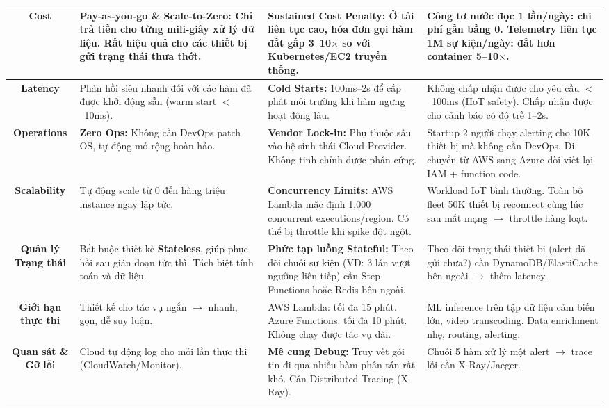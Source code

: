 \begin{longtable}{c p{4cm} p{4cm} p{4cm}}
\textbf{Cost}
& \textbf{Pay-as-you-go \& Scale-to-Zero:} Chỉ trả tiền cho từng mili-giây xử lý dữ liệu. Rất hiệu quả cho các thiết bị gửi trạng thái thưa thớt.
& \textbf{Sustained Cost Penalty:} Ở tải liên tục cao, hóa đơn gọi hàm đắt gấp 3--10$\times$ so với Kubernetes/EC2 truyền thống.
& Công tơ nước đọc 1 lần/ngày: chi phí gần bằng 0. Telemetry liên tục 1M sự kiện/ngày: đắt hơn container 5--10$\times$. \\
\hline
\textbf{Latency}
& Phản hồi siêu nhanh đối với các hàm đã được khởi động sẵn (warm start $<$~10ms).
& \textbf{Cold Starts:} 100ms--2s để cấp phát môi trường khi hàm ngưng hoạt động lâu.
& Không chấp nhận được cho yêu cầu $<$~100ms (IIoT safety). Chấp nhận được cho cảnh báo có độ trễ 1--2s. \\
\hline
\textbf{Operations}
& \textbf{Zero Ops:} Không cần DevOps patch OS, tự động mở rộng hoàn hảo.
& \textbf{Vendor Lock-in:} Phụ thuộc sâu vào hệ sinh thái Cloud Provider. Không tinh chỉnh được phần cứng.
& Startup 2 người chạy alerting cho 10K thiết bị mà không cần DevOps. Di chuyển từ AWS sang Azure đòi viết lại IAM + function code. \\
\hline
\textbf{Scalability}
& Tự động scale từ 0 đến hàng triệu instance ngay lập tức.
& \textbf{Concurrency Limits:} AWS Lambda mặc định 1,000 concurrent executions/region. Có thể bị throttle khi spike đột ngột.
& Workload IoT bình thường. Toàn bộ fleet 50K thiết bị reconnect cùng lúc sau mất mạng $\rightarrow$ throttle hàng loạt. \\
\hline
\textbf{Quản lý Trạng thái}
& Bắt buộc thiết kế \textbf{Stateless}, giúp phục hồi sau gián đoạn tức thì. Tách biệt tính toán và dữ liệu.
& \textbf{Phức tạp luồng Stateful:} Theo dõi chuỗi sự kiện (VD: 3 lần vượt ngưỡng liên tiếp) cần Step Functions hoặc Redis bên ngoài.
& Theo dõi trạng thái thiết bị (alert đã gửi chưa?) cần DynamoDB/ElastiCache bên ngoài $\rightarrow$ thêm latency. \\
\hline
\textbf{Giới hạn thực thi}
& Thiết kế cho tác vụ ngắn $\rightarrow$ nhanh, gọn, dễ suy luận.
& AWS Lambda: tối đa 15 phút. Azure Functions: tối đa 10 phút. Không chạy được tác vụ dài.
& ML inference trên tập dữ liệu cảm biến lớn, video transcoding. Data enrichment nhẹ, routing, alerting. \\
\hline
\textbf{Quan sát \& Gỡ lỗi}
& Cloud tự động log cho mỗi lần thực thi (CloudWatch/Monitor).
& \textbf{Mê cung Debug:} Truy vết gói tin đi qua nhiều hàm phân tán rất khó. Cần Distributed Tracing (X-Ray).
& Chuỗi 5 hàm xử lý một alert $\rightarrow$ trace lỗi cần X-Ray/Jaeger. \\

\end{longtable}

